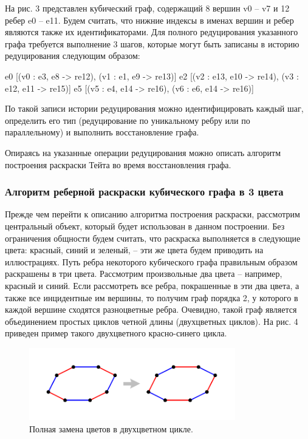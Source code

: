 На рис. 3 представлен кубический граф, содержащий 8 вершин v0 – v7 и 12 ребер e0 – e11. Будем считать, что нижние индексы в именах вершин и ребер являются также их идентификаторами.
Для полного редуцирования указанного графа требуется выполнение 3 шагов, которые могут быть записаны в историю редуцирования следующим образом:

e0 [(v0 : e3, e8 -> re12), (v1 : e1, e9 -> re13)]
e2 [(v2 : e13, e10 -> re14), (v3 : e12, e11 -> re15)]
e5 [(v5 : e4, e14 -> re16), (v6 : e6, e14 -> re16)]

По такой записи истории редуцирования можно идентифицировать каждый шаг, определить его тип (редуцирование по уникальному ребру или по параллельному) и выполнить восстановление графа.

Опираясь на указанные операции редуцирования можно описать алгоритм построения раскраски Тейта во время восстановления графа.

\subsubsection{Алгоритм реберной раскраски кубического графа в 3 цвета}

Прежде чем перейти к описанию алгоритма построения раскраски, рассмотрим центральный объект, который будет использован в данном построении. Без ограничения общности будем считать, что раскраска выполняется в следующие цвета: красный, синий и зеленый, – эти же цвета будем приводить на иллюстрациях.
Путь ребра некоторого кубического графа правильным образом раскрашены в три цвета.
Рассмотрим произвольные два цвета – например, красный и синий.
Если рассмотреть все ребра, покрашенные в эти два цвета, а также все инцидентные им вершины, то получим граф порядка 2, у которого в каждой вершине сходятся разноцветные ребра. Очевидно, такой граф является объединением простых циклов четной длины (двухцветных циклов).
На рис. 4 приведен пример такого двухцветного красно-синего цикла.

\begin{figure}[ht]
\centering
\includegraphics[width=0.8\textwidth]{./pics/text_3_edge_coloring/4-bicolor-cycle.pdf}
\singlespacing
{}\caption{Полная замена цветов в двухцветном цикле.}
\label{fig:text_3_edge_coloring_4}
\end{figure}

